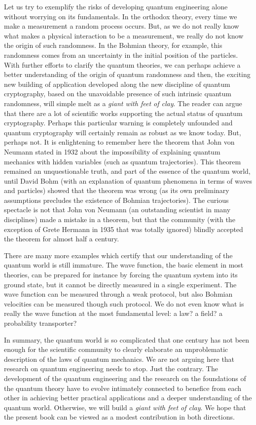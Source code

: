 \documentclass[nofootinbib, secnumarabic, amsmath, nobibnotes,10pt,aps,pra]{revtex4-1}
\begin{document}
Let us try to exemplify the risks of developing quantum engineering alone without worrying on its fundamentals. In the orthodox theory, every time we make a measurement a random process occurs. But, as we do not really know what makes a physical interaction to be a measurement, we really do not know the origin of such randomness. In the Bohmian theory, for example, this randomness comes from an uncertainty in the initial position of the particles. With further efforts to clarify the quantum theories, we can perhaps achieve a better understanding of the origin of quantum randomness and then, the exciting new building of application developed along the new discipline of quantum cryptography, based on the unavoidable presence of such intrinsic quantum randomness, will simple melt as a \emph{giant with feet of clay}. The reader can argue that there are a lot of scientific works supporting the actual status of quantum cryptography. Perhaps this particular warning is completely unfounded and quantum cryptography will certainly remain as robust as we know today. But, perhaps not. It is enlightening to remember here the theorem that John von Neumann stated in 1932 about the impossibility of explaining quantum mechanics with hidden variables (such as quantum trajectories). This theorem remained an unquestionable truth, and part of the essence of the quantum world, until David Bohm (with an explanation of quantum phenomena in terms of waves and particles) showed that the theorem was wrong (as its own preliminary assumptions precludes the existence of Bohmian trajectories). The curious spectacle is not that John von Neumann (an outstanding scientist in many disciplines) made a mistake in a theorem, but that the community (with the exception of Grete Hermann in 1935 that was totally ignored) blindly accepted the theorem for almost half a century.

There are many more examples which certify that our understanding of the quantum world is still immature. The wave function, the basic element in most theories, can be prepared for instance by forcing the quantum system into its ground state, but it cannot be directly measured in a single experiment. The wave function can be measured through a weak protocol, but also Bohmian velocities can be measured though such protocol. We do not even know what is really the wave function at the most fundamental level: a law? a field? a probability transporter? 

In summary, the quantum world is so complicated that one century has not been enough for the scientific community to clearly elaborate an unproblematic description of the laws of quantum mechanics. We are not arguing here that research on quantum engineering needs to stop. Just the contrary. The development of the quantum engineering and the research on the foundations of the quantum theory have to evolve intimately connected to benefice from each other in achieving better practical applications and a deeper understanding of the quantum world. Otherwise, we will build a \emph{giant with feet of clay}. We hope that the present book can be viewed as a modest contribution in both directions.
\end{document}
